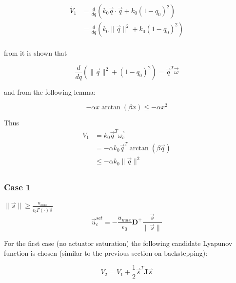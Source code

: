 \begin{equation}
    \begin{split}
    \dot{V_{1}}&=\frac{d}{dq}(k_{0}\vec{q}\cdot\vec{q}+k_{0}(1-q_{0})^2) \\
    &=\frac{d}{dq}(k_{0}\lVert\vec{q}\rVert^2+k_{0}(1-q_{0})^2) \\
    \end{split}
\end{equation}

from \cite{kimRobustBacksteppingControl2003} it is shown that

\begin{equation}
    \frac{d}{dq}(\lVert \vec{q} \rVert^{2}+(1-q_{0})^2) = \vec{q}^T \vec{\omega}
\end{equation}

and from the following lemma:

\begin{equation}
    -\alpha x \arctan(\beta x) \leq -\alpha x^2
\end{equation}

Thus
\begin{equation}
    \begin{split}
        \dot{V_{1}}&=k_{0}\vec{q}^T\vec{\omega_c} \\
        &= -\alpha k_{0}\vec{q}^T \arctan(\beta \vec{q}) \\
        &\leq -\alpha k_{0} \lVert\vec{q}\rVert^{2}
    \end{split}
\end{equation}

\subsection{} \label{apx:B}
\subsubsection{Case 1} $\lVert \vec{s} \rVert \geq \frac{u_{max}}{\epsilon_0\Gamma(\cdot)\vec{s}}$
\begin{equation}
\vec{u}_c^{sat} = -\frac{u_{max}}{\epsilon_0}\mathbf{D}^+ \frac{\vec{s}}{\lVert \vec{s} \rVert}
\end{equation}

For the first case (no actuator saturation) the following candidate Lyapunov function is chosen (similar to the previous section on backstepping):

\begin{equation}
    V_2=V_1 + \frac{1}{2}\vec{s}^T\mathbf{J}\vec{s}
\end{equation}

